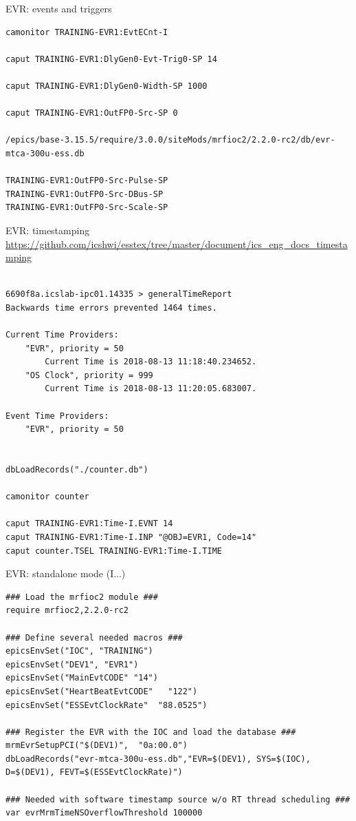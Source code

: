 \documentclass[
  9pt
  , table
  , ignorenonframetext
]{beamer}
\begin{document}
\begin{frame}[fragile]{EVR: events and triggers}
\begin{lstlisting}[style=termstyle,breaklines=true,basicstyle=\scriptsize]
camonitor TRAINING-EVR1:EvtECnt-I

caput TRAINING-EVR1:DlyGen0-Evt-Trig0-SP 14

caput TRAINING-EVR1:DlyGen0-Width-SP 1000

caput TRAINING-EVR1:OutFP0-Src-SP 0

/epics/base-3.15.5/require/3.0.0/siteMods/mrfioc2/2.2.0-rc2/db/evr-mtca-300u-ess.db

TRAINING-EVR1:OutFP0-Src-Pulse-SP
TRAINING-EVR1:OutFP0-Src-DBus-SP
TRAINING-EVR1:OutFP0-Src-Scale-SP

\end{lstlisting}
\end{frame}

\begin{frame}[fragile]{EVR: timestamping}
\url{https://github.com/icshwi/esstex/tree/master/document/ics_eng_docs_timestamping}
\begin{lstlisting}[style=termstyle,breaklines=true,basicstyle=\scriptsize]

6690f8a.icslab-ipc01.14335 > generalTimeReport
Backwards time errors prevented 1464 times.

Current Time Providers:
    "EVR", priority = 50
        Current Time is 2018-08-13 11:18:40.234652.
    "OS Clock", priority = 999
        Current Time is 2018-08-13 11:20:05.683007.

Event Time Providers:
    "EVR", priority = 50


dbLoadRecords("./counter.db")

camonitor counter

caput TRAINING-EVR1:Time-I.EVNT 14
caput TRAINING-EVR1:Time-I.INP "@OBJ=EVR1, Code=14"
caput counter.TSEL TRAINING-EVR1:Time-I.TIME

\end{lstlisting}
\end{frame}

\begin{frame}[fragile]{EVR: standalone mode (I...)}
\begin{lstlisting}[style=termstyle,breaklines=true,basicstyle=\scriptsize]
### Load the mrfioc2 module ###
require mrfioc2,2.2.0-rc2

### Define several needed macros ###
epicsEnvSet("IOC", "TRAINING")
epicsEnvSet("DEV1", "EVR1")
epicsEnvSet("MainEvtCODE" "14")
epicsEnvSet("HeartBeatEvtCODE"   "122")
epicsEnvSet("ESSEvtClockRate"  "88.0525")

### Register the EVR with the IOC and load the database ###
mrmEvrSetupPCI("$(DEV1)",  "0a:00.0")
dbLoadRecords("evr-mtca-300u-ess.db","EVR=$(DEV1), SYS=$(IOC), D=$(DEV1), FEVT=$(ESSEvtClockRate)")

### Needed with software timestamp source w/o RT thread scheduling ###
var evrMrmTimeNSOverflowThreshold 100000

\end{lstlisting}
\end{frame}
\end{document}

